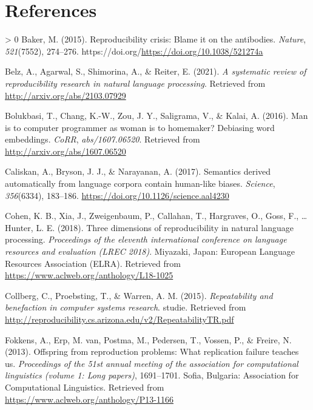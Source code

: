 \documentclass[
  english,
  man,floatsintext]{apa6}
\newlength{\cslhangindent}
\newenvironment{CSLReferences}[3] %
 {%
  \setlength{\parindent}{0pt}
  \ifodd #1 \everypar{\setlength{\hangindent}{\cslhangindent}}\ignorespaces\fi
  \ifnum #2 > 0
  \setlength{\parskip}{#3\baselineskip}
  \fi
 }%
 {}
\begin{document}
\newpage

\hypertarget{references}{%
\section{References}\label{references}}

\begingroup
\setlength{\parindent}{-0.5in}
\setlength{\leftskip}{0.5in}

\hypertarget{refs}{}
\begin{CSLReferences}{1}{0}
\leavevmode\hypertarget{ref-baker_2015}{}%
Baker, M. (2015). Reproducibility crisis: Blame it on the antibodies. \emph{Nature}, \emph{521}(7552), 274--276. https://doi.org/\url{https://doi.org/10.1038/521274a}

\leavevmode\hypertarget{ref-belz_2021}{}%
Belz, A., Agarwal, S., Shimorina, A., \& Reiter, E. (2021). \emph{A systematic review of reproducibility research in natural language processing}. Retrieved from \url{http://arxiv.org/abs/2103.07929}

\leavevmode\hypertarget{ref-bolukbasi_2016}{}%
Bolukbasi, T., Chang, K.-W., Zou, J. Y., Saligrama, V., \& Kalai, A. (2016). Man is to computer programmer as woman is to homemaker? Debiasing word embeddings. \emph{CoRR}, \emph{abs/1607.06520}. Retrieved from \url{http://arxiv.org/abs/1607.06520}

\leavevmode\hypertarget{ref-caliskan_2017}{}%
Caliskan, A., Bryson, J. J., \& Narayanan, A. (2017). Semantics derived automatically from language corpora contain human-like biases. \emph{Science}, \emph{356}(6334), 183--186. \url{https://doi.org/10.1126/science.aal4230}

\leavevmode\hypertarget{ref-cohen_2018}{}%
Cohen, K. B., Xia, J., Zweigenbaum, P., Callahan, T., Hargraves, O., Goss, F., \ldots{} Hunter, L. E. (2018). Three dimensions of reproducibility in natural language processing. \emph{Proceedings of the eleventh international conference on language resources and evaluation ({LREC} 2018)}. Miyazaki, Japan: European Language Resources Association (ELRA). Retrieved from \url{https://www.aclweb.org/anthology/L18-1025}

\leavevmode\hypertarget{ref-collberg_2015}{}%
Collberg, C., Proebsting, T., \& Warren, A. M. (2015). \emph{Repeatability and benefaction in computer systems research}. studie. Retrieved from \url{http://reproducibility.cs.arizona.edu/v2/RepeatabilityTR.pdf}

\leavevmode\hypertarget{ref-fokkens_2013}{}%
Fokkens, A., Erp, M. van, Postma, M., Pedersen, T., Vossen, P., \& Freire, N. (2013). Offspring from reproduction problems: What replication failure teaches us. \emph{Proceedings of the 51st annual meeting of the association for computational linguistics (volume 1: Long papers)}, 1691--1701. Sofia, Bulgaria: Association for Computational Linguistics. Retrieved from \url{https://www.aclweb.org/anthology/P13-1166}


\end{CSLReferences}
\end{document}
